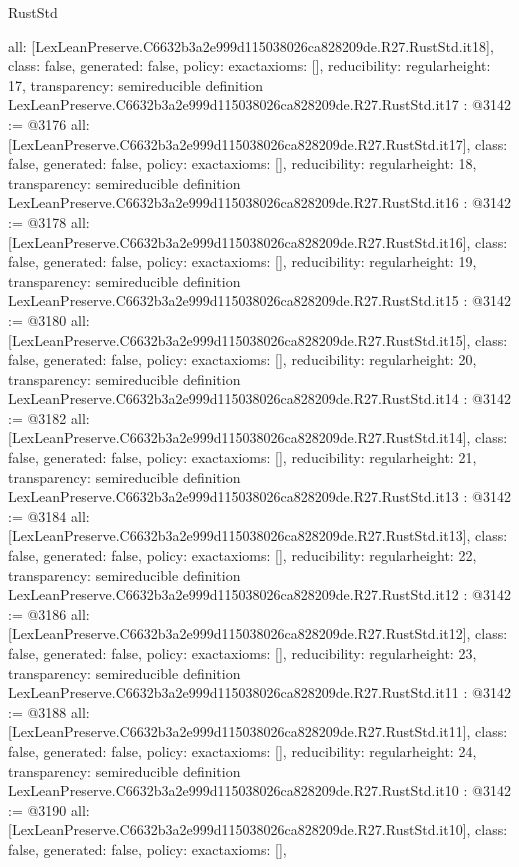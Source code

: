 \begin{lexlean}{RustStd}
\begin{coremodule}
{  all: [LexLeanPreserve.C6632b3a2e999d115038026ca828209de.R27.RustStd.it18],
  class: false,
  generated: false,
  policy: exact{axioms: []},
  reducibility: regular{height: 17},
  transparency: semireducible
}
definition LexLeanPreserve.C6632b3a2e999d115038026ca828209de.R27.RustStd.it17 : @3142 := @3176 {
  all: [LexLeanPreserve.C6632b3a2e999d115038026ca828209de.R27.RustStd.it17],
  class: false,
  generated: false,
  policy: exact{axioms: []},
  reducibility: regular{height: 18},
  transparency: semireducible
}
definition LexLeanPreserve.C6632b3a2e999d115038026ca828209de.R27.RustStd.it16 : @3142 := @3178 {
  all: [LexLeanPreserve.C6632b3a2e999d115038026ca828209de.R27.RustStd.it16],
  class: false,
  generated: false,
  policy: exact{axioms: []},
  reducibility: regular{height: 19},
  transparency: semireducible
}
definition LexLeanPreserve.C6632b3a2e999d115038026ca828209de.R27.RustStd.it15 : @3142 := @3180 {
  all: [LexLeanPreserve.C6632b3a2e999d115038026ca828209de.R27.RustStd.it15],
  class: false,
  generated: false,
  policy: exact{axioms: []},
  reducibility: regular{height: 20},
  transparency: semireducible
}
definition LexLeanPreserve.C6632b3a2e999d115038026ca828209de.R27.RustStd.it14 : @3142 := @3182 {
  all: [LexLeanPreserve.C6632b3a2e999d115038026ca828209de.R27.RustStd.it14],
  class: false,
  generated: false,
  policy: exact{axioms: []},
  reducibility: regular{height: 21},
  transparency: semireducible
}
definition LexLeanPreserve.C6632b3a2e999d115038026ca828209de.R27.RustStd.it13 : @3142 := @3184 {
  all: [LexLeanPreserve.C6632b3a2e999d115038026ca828209de.R27.RustStd.it13],
  class: false,
  generated: false,
  policy: exact{axioms: []},
  reducibility: regular{height: 22},
  transparency: semireducible
}
definition LexLeanPreserve.C6632b3a2e999d115038026ca828209de.R27.RustStd.it12 : @3142 := @3186 {
  all: [LexLeanPreserve.C6632b3a2e999d115038026ca828209de.R27.RustStd.it12],
  class: false,
  generated: false,
  policy: exact{axioms: []},
  reducibility: regular{height: 23},
  transparency: semireducible
}
definition LexLeanPreserve.C6632b3a2e999d115038026ca828209de.R27.RustStd.it11 : @3142 := @3188 {
  all: [LexLeanPreserve.C6632b3a2e999d115038026ca828209de.R27.RustStd.it11],
  class: false,
  generated: false,
  policy: exact{axioms: []},
  reducibility: regular{height: 24},
  transparency: semireducible
}
definition LexLeanPreserve.C6632b3a2e999d115038026ca828209de.R27.RustStd.it10 : @3142 := @3190 {
  all: [LexLeanPreserve.C6632b3a2e999d115038026ca828209de.R27.RustStd.it10],
  class: false,
  generated: false,
  policy: exact{axioms: []},
}
\end{coremodule}
\end{lexlean}
